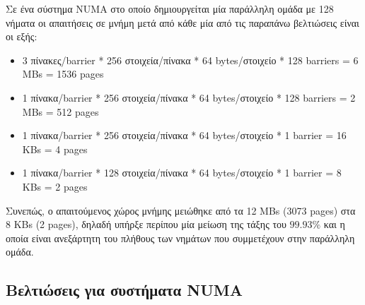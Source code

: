 Σε ένα σύστημα NUMA στο οποίο δημιουργείται μία παράλληλη ομάδα με 128 νήματα οι απαιτήσεις σε μνήμη μετά από κάθε μία από τις παραπάνω βελτιώσεις είναι οι εξής:
\begin{itemize}
	\item 3 πίνακες/barrier * 256 στοιχεία/πίνακα * 64 bytes/στοιχείο * 128 barriers \newline = 6 MBs = 1536 pages
	\item 1 πίνακα/barrier * 256 στοιχεία/πίνακα * 64 bytes/στοιχείο * 128 barriers \newline = 2 MBs = 512 pages
	\item 1 πίνακα/barrier * 256 στοιχεία/πίνακα * 64 bytes/στοιχείο * 1 barrier \newline = 16 KBs = 4 pages
	\item 1 πίνακα/barrier * 128 στοιχεία/πίνακα * 64 bytes/στοιχείο * 1 barrier \newline = 8 KBs = 2 pages
\end{itemize}

Συνεπώς, ο απαιτούμενος χώρος μνήμης μειώθηκε από τα 12 MBs (3073 pages) στα 8 KBs (2 pages), δηλαδή υπήρξε περίπου μία μείωση της τάξης του $99.93\%$ και η οποία είναι ανεξάρτητη του πλήθους των νημάτων που συμμετέχουν στην παράλληλη ομάδα.


\subsection{Βελτιώσεις για συστήματα NUMA}